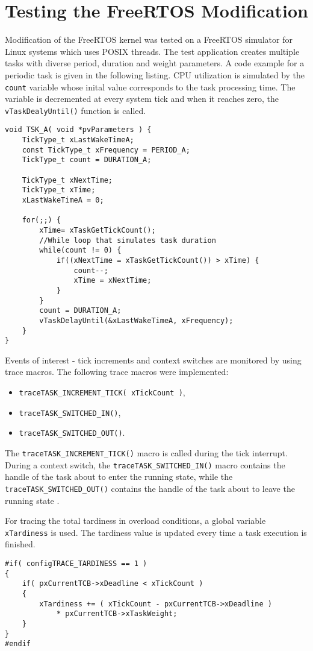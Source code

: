\section{Testing the FreeRTOS Modification}
Modification of the FreeRTOS kernel was tested on a FreeRTOS simulator for Linux systems which uses POSIX threads.
The test application creates multiple tasks with diverse period, duration and weight parameters. 
A code example for a periodic task is given in the following listing.
CPU utilization is simulated by the \verb$count$ variable whose inital value corresponds to the task processing time. 
The variable is decremented at every system tick and when it reaches zero, the \verb$vTaskDealyUntil()$ function is called. 
\begin{lstlisting}[frame=none, label={switchcontext}, caption={Task function simulating a periodic task.}, captionpos=b]
void TSK_A( void *pvParameters ) {
    TickType_t xLastWakeTimeA;
    const TickType_t xFrequency = PERIOD_A;
    TickType_t count = DURATION_A;

    TickType_t xNextTime;
    TickType_t xTime;
    xLastWakeTimeA = 0;
    
    for(;;) {
        xTime= xTaskGetTickCount();
        //While loop that simulates task duration
        while(count != 0) {
            if((xNextTime = xTaskGetTickCount()) > xTime) {
                count--;
                xTime = xNextTime;
            }
        }
        count = DURATION_A;
        vTaskDelayUntil(&xLastWakeTimeA, xFrequency);
    }
}
\end{lstlisting}
Events of interest - tick increments and context switches are monitored by using trace macros. 
The following trace macros were implemented:
\begin{itemize}
	\item \verb$traceTASK_INCREMENT_TICK( xTickCount )$,
	\item \verb$traceTASK_SWITCHED_IN()$,
	\item \verb$traceTASK_SWITCHED_OUT()$.
\end{itemize}
The \verb$traceTASK_INCREMENT_TICK()$ macro is called during the tick interrupt.
During a context switch, the \verb$traceTASK_SWITCHED_IN()$ macro contains the handle of the task about to enter the running state, while the \verb$traceTASK_SWITCHED_OUT()$ contains the handle of the task about to leave the running state \cite{freertosref}. 

For tracing the total tardiness in overload conditions, a global variable \verb$xTardiness$ is used.
The tardiness value is updated every time a task execution is finished.
\begin{lstlisting}[frame=none, label={tardiness}, caption={Updating the \texttt{xTardiness} variable.}, captionpos=b]
#if( configTRACE_TARDINESS == 1 )
{
	if( pxCurrentTCB->xDeadline < xTickCount )
	{
		xTardiness += ( xTickCount - pxCurrentTCB->xDeadline ) 
			* pxCurrentTCB->xTaskWeight;
	}
}
#endif
\end{lstlisting}

